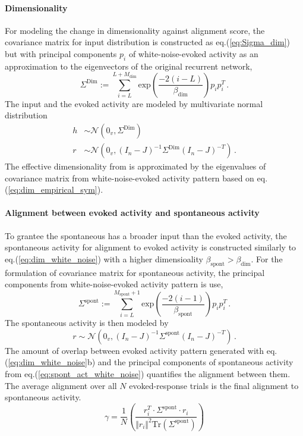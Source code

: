 \documentclass[11pt]{article}
\begin{document}
	\paragraph{Dimensionality} For modeling the change in dimensionality against alignment score, the covariance matrix for input distribution is constructed as eq.(\ref{eq:Sigma_dim}) but with principal components $p_i$ of white-noise-evoked activity as an approximation to the eigenvectors of the original recurrent network, 
		\begin{equation} \label{eq:dim_white_noise}
			\Sigma^{\text{Dim}} := \sum_{i=L}^{L+M_{\text{dim}}} \text{exp}\left(\frac{-2(i-L)}{\beta_{\text{dim}}}\right) p_i p_i^T \, .
		\end{equation}
	The input and the evoked activity are modeled by multivariate normal distribution 
		\begin{subequations} 
			\begin{align}
				h & \sim \mathcal{N}(0_v, \Sigma^{\text{Dim}}) \\
				r & \sim \mathcal{N}(0_v, (I_n - J)^{-1} \Sigma^{\text{Dim}} (I_n - J)^{-T}) \,.
			\end{align}
		\end{subequations}
	The effective dimensionality from is approximated by the eigenvalues of covariance matrix from white-noise-evoked activity pattern based on eq.(\ref{eq:dim_empirical_sym}). 
	
	\paragraph{Alignment between evoked activity and spontaneous activity}  To grantee the spontaneous has a broader input than the evoked activity, the spontaneous activity for alignment to evoked activity is constructed similarly to eq.(\ref{eq:dim_white_noise}) with a higher dimensioality $\beta_{\text{spont}} > \beta_{\text{dim}}$. For the formulation of covariance matrix for spontaneous activity, the principal components from white-noise-evoked activity pattern is use, 
		\begin{equation}
			\Sigma^{\text{spont}} := \sum_{i=L}^{M_{\text{spont}}+1} \text{exp}\left(\frac{-2(i-1)}{\beta_{\text{spont}}}\right) p_i p_i^T \, .
		\end{equation}
	The spontaneous activity is then modeled by
		\begin{equation} \label{eq:spont_act_white_noise}
			r \sim \mathcal{N}(0_v, (I_n - J)^{-1} \Sigma^{\text{spont}} (I_n - J)^{-T}) \,. 
		\end{equation}
	The amount of overlap between evoked activity pattern generated with eq.(\ref{eq:dim_white_noise}b) and the principal components of spontaneous activity from eq.(\ref{eq:spont_act_white_noise}) quantifies the alignment between them. The average alignment over all $N$ evoked-response trials is the final alignment to spontaneous activity.
		\begin{equation}
			\gamma = \frac{1}{N} \left(\frac{r^T_{i} \cdot \Sigma^{\text{spont}} \cdot r_{i}}{\Vert r_{i} \Vert^2 \text{Tr}(\Sigma^{\text{spont}} )}\right)
		\end{equation}
	
\end{document}
